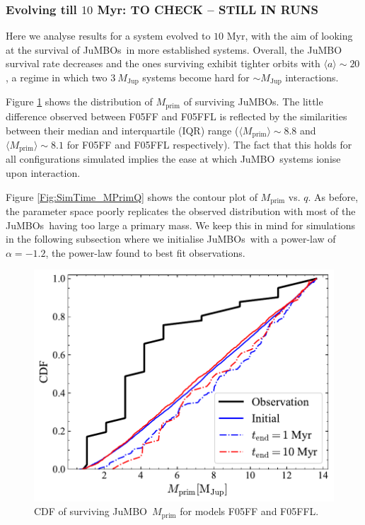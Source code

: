 \documentclass[aa]{lib/aa}
\newcommand{\jumbo}{\mbox{JuMBO}}
\newcommand{\jumbos}{\mbox{JuMBOs}}
\begin{document}
    \subsubsection{Evolving till $10$ Myr: TO CHECK -- STILL IN RUNS}
        Here we analyse results for a system evolved to $10$ Myr, with the aim of looking at the survival of \jumbos\, in more established systems. Overall, the \jumbo\, survival rate decreases and the ones surviving exhibit tighter orbits with $\langle a\rangle \sim 20$, a regime in which two $3\ M_{\mathrm{Jup}}$ systems become hard for $\sim M_{\mathrm{Jup}}$ interactions. 
        
        Figure \ref{Fig:Mdistr_SimTime} shows the distribution of $M_{\mathrm{prim}}$ of surviving JuMBOs. The little difference  observed between F05FF and F05FFL is reflected by the similarities between their median and interquartile (IQR) range ($\langle M_{\mathrm{prim}}\rangle\sim 8.8$ and $\langle M_{\mathrm{prim}}\rangle \sim 8.1$ for F05FF and F05FFL respectively). The fact that this holds for all configurations simulated implies the ease at which \jumbo\, systems ionise upon interaction.

        Figure \ref{Fig:SimTime_MPrimQ} shows the contour plot of $M_{\mathrm{prim}}$ vs. $q$. As before, the parameter space poorly replicates the observed distribution with most of the \jumbos\, having too large a primary mass. We keep this in mind for simulations in the following subsection where we initialise \jumbos\, with a power-law of $\alpha = -1.2$, the power-law found to best fit observations.
   
   \begin{figure}
    \centering
        \includegraphics[width=\columnwidth]{figures/SimTime_mprim_vs_obs_.pdf}
        \caption{CDF of surviving \jumbo\, $M_{\mathrm{prim}}$ for models F05FF and F05FFL.}
         \label{Fig:Mdistr_SimTime}
   \end{figure}
   
\end{document}
